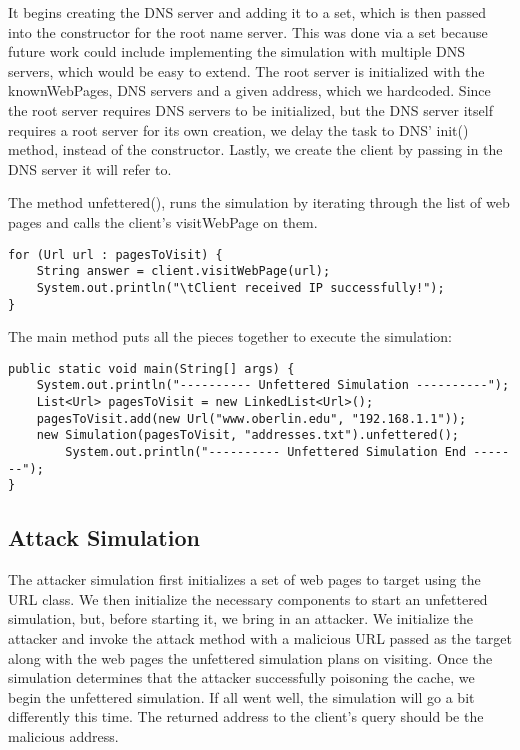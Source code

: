\documentclass[a4paper, 12pt]{article} %
\begin{document}
It begins creating the DNS server and adding it to a set, which is then passed into the constructor for the root name server. This was done via a set because future work could include implementing the simulation with multiple DNS servers, which would be easy to extend. The root server is initialized with the knownWebPages, DNS servers and a given address, which we hardcoded. Since the root server requires DNS servers to be initialized, but the DNS server itself requires a root server for its own creation, we delay the task to DNS’ init() method, instead of the constructor. Lastly, we create the client by passing in the DNS server it will refer to.

The method unfettered(), runs the simulation by iterating through the list of web pages and calls the client’s visitWebPage on them. 

\begin{lstlisting}
for (Url url : pagesToVisit) {
	String answer = client.visitWebPage(url);
	System.out.println("\tClient received IP successfully!");
}
\end{lstlisting}

The main method puts all the pieces together to execute the simulation:

\begin{lstlisting}
public static void main(String[] args) {
	System.out.println("---------- Unfettered Simulation ----------");
	List<Url> pagesToVisit = new LinkedList<Url>();
	pagesToVisit.add(new Url("www.oberlin.edu", "192.168.1.1"));
	new Simulation(pagesToVisit, "addresses.txt").unfettered();
		System.out.println("---------- Unfettered Simulation End -------");
}
\end{lstlisting}




\subsection*{Attack Simulation}

The attacker simulation first initializes a set of web pages to target using the URL class. We then initialize the necessary components to start an unfettered simulation, but, before starting it, we bring in an attacker. We initialize the attacker and invoke the attack method with a malicious URL passed as the target along with the web pages the unfettered simulation plans on visiting. Once the simulation determines that the attacker successfully poisoning the cache, we begin the unfettered simulation. If all went well, the simulation will go a bit differently this time. The returned address to the client's query should be the malicious address.
\end{document}
